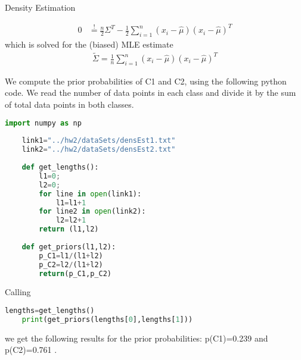 \documentclass[
ngerman,
]{tudaexercise}
\newcommand{\sni}{\sum_{i=1}^{n}}
\begin{document}
\begin{task}{Density Estimation}
\begin{subtask}
\begin{align*}
			0&\stackrel{!}{=}\frac{n}{2}\Sigma^T-\frac{1}{2}\sni(x_i-\hat{\mu})(x_i-\hat{\mu})^T
		\end{align*}
		which is solved for the (biased) MLE estimate
		\begin{align}
			\tilde{\Sigma}=\frac{1}{n}\sni (x_i-\hat{\mu})(x_i-\hat{\mu})^T
		\end{align}
		\end{subtask}
	\begin{subtask}
		We compute the prior probabilities of C1 and C2, using the following python code. We read the number of data points in each class and divide it by the sum of total data points in both classes.
		\begin{lstlisting}[language=Python]
	import numpy as np
	
	link1="../hw2/dataSets/densEst1.txt"
	link2="../hw2/dataSets/densEst2.txt"
	
	def get_lengths():
		l1=0;
		l2=0;
		for line in open(link1):
			l1=l1+1
		for line2 in open(link2):
			l2=l2+1
		return (l1,l2)    
	
	def get_priors(l1,l2):
		p_C1=l1/(l1+l2)
		p_C2=l2/(l1+l2)
		return(p_C1,p_C2)
		\end{lstlisting}
		Calling
		\begin{lstlisting}[language=Python]
	lengths=get_lengths()
	print(get_priors(lengths[0],lengths[1]))
		\end{lstlisting}
		we get the following results for the prior probabilities: p(C1)=0.239 and p(C2)=0.761 .
		\end{subtask}
	\end{task}
	
\end{document}
